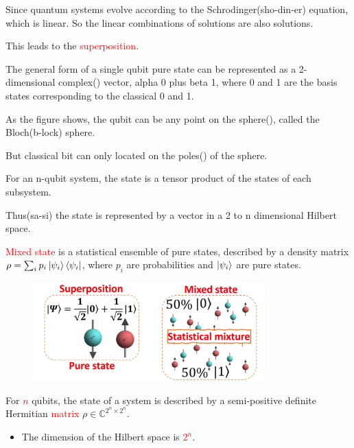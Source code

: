 \documentclass[10pt]{beamer}
\begin{document}
\begin{CJK}{UTF8}{gbsn}
{ Since quantum systems evolve according to the Schrodinger(sho-din-er) equation, which is linear. 
 So the linear combinations of solutions are also solutions. 
  
 This leads to the \textcolor{red}{superposition}.

 The general form of a single qubit pure state can be represented as a 2-dimensional complex() vector, alpha 0 plus beta 1, where 0 and 1 are the basis states corresponding to the classical 0 and 1.


 As the figure shows, the qubit can be any point on the sphere(), called the Bloch(b-lock) sphere.

 But classical bit can only located on the poles() of the sphere.


  
 For an n-qubit system, the state is a tensor product of the states of each subsystem.

 Thus(sa-si) the state is represented by a vector in a 2 to n dimensional Hilbert space.
}


  \begin{frame}
    \textcolor{red}{Mixed state} is a statistical ensemble of pure states, described by a density matrix $\rho=\sum_{i}p_i\ket{\psi_i}\bra{\psi_i}$, where $p_i$ are probabilities and $\ket{\psi_i}$ are pure states.
    \begin{figure}
      \centering
      \includegraphics[width=0.8\textwidth]{fig/mixstate.png}
    \end{figure}
 For \textcolor{red}{$n$} qubits, the state of a system is described by a semi-positive definite Hermitian \textcolor{red}{matrix} $\rho\in \mathbb{C}^{2^n \times 2^n}$.

  \begin{itemize}
    \item The dimension of the Hilbert space is \textcolor{red}{$2^n$}.
  \end{itemize}
\end{frame}
\end{CJK}
\end{document}
